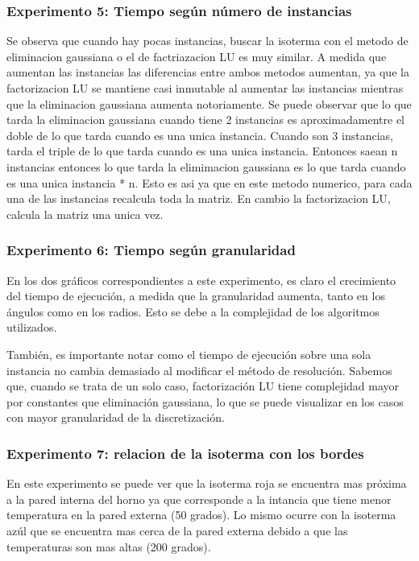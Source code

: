 \subsubsection*{Experimento 5: Tiempo según número de instancias}
	Se observa que cuando hay pocas instancias, buscar la isoterma con el metodo de eliminacion gaussiana o el de factriazacion LU es muy similar. A medida que aumentan las instancias las diferencias entre ambos metodos aumentan, ya que la factorizacion LU se mantiene casi inmutable al aumentar las instancias mientras que la eliminacion gaussiana aumenta notoriamente. Se puede observar que lo que tarda la eliminacion gaussiana cuando tiene 2 instancias es aproximadamentre el doble de lo que tarda cuando es una unica instancia. Cuando son 3 instancias, tarda el triple de lo que tarda cuando es una unica instancia. Entonces saean n instancias entonces lo que tarda la elimimacion gaussiana es lo que tarda cuando es una unica instancia * n. Esto es asi ya que en este metodo numerico, para cada una de las instancias recalcula toda la matriz. En cambio la factorizacion LU, calcula la matriz una unica vez.


\subsubsection*{Experimento 6: Tiempo según granularidad}
  	En los dos gráficos correspondientes a este experimento, es claro el crecimiento del tiempo de ejecución, a medida que la granularidad aumenta, tanto en los ángulos como en los radios. Esto se debe a la complejidad de los algoritmos utilizados.

  	También, es importante notar como el tiempo de ejecución sobre una sola instancia no cambia demasiado al modificar el método de resolución. Sabemos que, cuando se trata de un solo caso, factorización LU tiene complejidad mayor por constantes que eliminación gaussiana, lo que se puede visualizar en los casos con mayor granularidad de la discretización.


\subsubsection*{Experimento 7: relacion de la isoterma con los bordes}
 	En este experimento se puede ver que la isoterma roja se encuentra mas próxima a la pared interna del horno ya que corresponde a la intancia que tiene menor temperatura en la pared externa (50 grados). Lo mismo ocurre con la isoterma azúl que se encuentra mas cerca de la pared externa debido a que las temperaturas son mas altas (200 grados).

